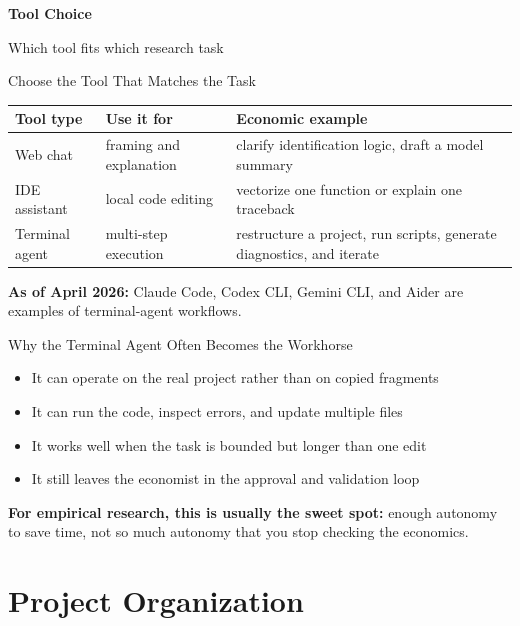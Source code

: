 \documentclass[10pt,english,aspectratio=169]{beamer}
\newcommand{\sectiondivider}[2]{%
\begin{frame}[plain,noframenumbering]
\begin{center}
\vfill
{\Large\textbf{#1}\par}
\vspace{0.35cm}
{\normalsize #2\par}
\vfill
\end{center}
\end{frame}
}
\begin{document}
\sectiondivider{Tool Choice}{Which tool fits which research task}

\begin{frame}{Choose the Tool That Matches the Task}
\begin{center}
\small
\begin{tabular}{|p{2.4cm}|p{3.7cm}|p{4.8cm}|}
\hline
\textbf{Tool type} & \textbf{Use it for} & \textbf{Economic example} \\ \hline
Web chat & framing and explanation & clarify identification logic, draft a model summary \\ \hline
IDE assistant & local code editing & vectorize one function or explain one traceback \\ \hline
Terminal agent & multi-step execution & restructure a project, run scripts, generate diagnostics, and iterate \\ \hline
\end{tabular}
\end{center}

\vspace{0.25cm}

\textbf{As of April 2026:} Claude Code, Codex CLI, Gemini CLI, and Aider are examples of terminal-agent workflows.
\end{frame}

\begin{frame}{Why the Terminal Agent Often Becomes the Workhorse}
\begin{itemize}
    \item It can operate on the real project rather than on copied fragments
    \item It can run the code, inspect errors, and update multiple files
    \item It works well when the task is bounded but longer than one edit
    \item It still leaves the economist in the approval and validation loop
\end{itemize}

\vspace{0.3cm}

\textbf{For empirical research, this is usually the sweet spot:} enough autonomy to save time, not so much autonomy that you stop checking the economics.
\end{frame}

\section{Project Organization}
\end{document}
